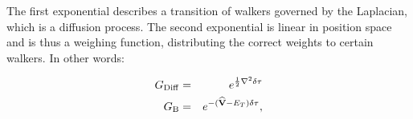 % 
% 
% 

The first exponential describes a transition of walkers governed by the Laplacian, which is a diffusion process. The second exponential is linear in position space and is thus a weighing function, distributing the correct weights to certain walkers. In other words:

\begin{eqnarray}
 G_\mathrm{Diff} &=& e^{\frac{1}{2}\nabla^2\delta\tau}\label{eq:GDiff} \\
 G_\mathrm{B} &=& e^{-({\bf\widehat{V}} - E_T)\delta\tau} \label{eq:GB},
\end{eqnarray}

